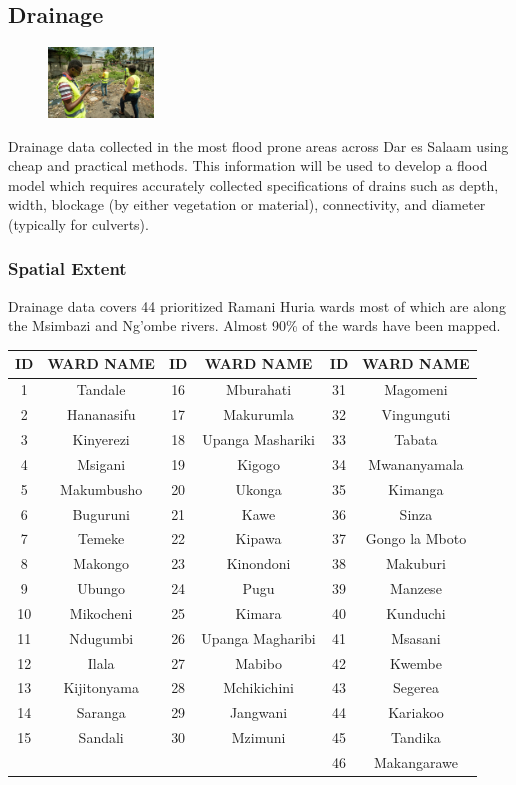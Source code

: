 \documentclass[a4paper,12pt,twoside]{article}
\begin{document}
\subsection{Drainage}
\begin{figure} %
    \centering
    \includegraphics[width=0.25\textwidth]{images/Drainage_Mapping.jpg}
\end{figure}

Drainage data collected in the most flood prone areas across Dar es Salaam using cheap  and practical methods. This information will be used to develop a flood model which requires accurately collected specifications of drains such as depth, width, blockage (by either vegetation or material), connectivity, and diameter (typically for culverts).

\subsubsection{Spatial Extent}
Drainage data covers 44 prioritized Ramani Huria wards most of which are along the Msimbazi and Ng’ombe rivers. Almost 90\% of the wards have been mapped.

\begin{center}
\begin{tabular}{|c|c|c|c|c|c|}
\hline
ID & WARD NAME & ID & WARD NAME & ID & WARD NAME\\
\hline
1 & Tandale & 16 & Mburahati & 31 & Magomeni\\
2 & Hananasifu & 17 & Makurumla & 32 & Vingunguti\\
3 & Kinyerezi & 18 & Upanga Mashariki & 33 & Tabata\\
4 & Msigani & 19 & Kigogo & 34 & Mwananyamala\\
5 & Makumbusho & 20 & Ukonga & 35 & Kimanga\\
6 & Buguruni & 21 & Kawe & 36 & Sinza\\
7 & Temeke & 22 & Kipawa & 37 & Gongo la Mboto\\
8 & Makongo & 23 & Kinondoni & 38 & Makuburi\\
9 & Ubungo & 24 & Pugu & 39 & Manzese\\
10 & Mikocheni & 25 & Kimara & 40 & Kunduchi\\
11 & Ndugumbi & 26 & Upanga Magharibi & 41 & Msasani\\
12 & Ilala & 27 & Mabibo & 42 & Kwembe\\
13 & Kijitonyama & 28 & Mchikichini & 43 & Segerea\\
14 & Saranga & 29 & Jangwani & 44 & Kariakoo\\
15 & Sandali & 30 & Mzimuni & 45 & Tandika\\
{} & {} & {} & {} & 46 & Makangarawe\\
 \hline
\end{tabular}
\end{center}
\end{document}
